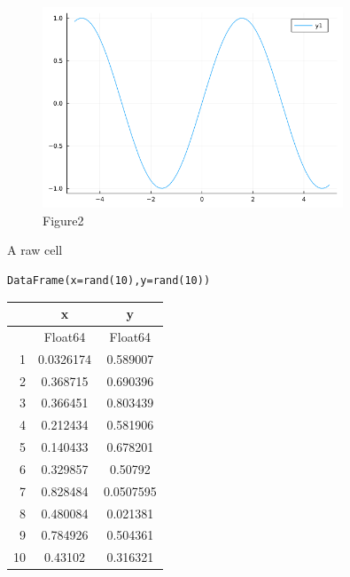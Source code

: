 \begin{figure}[H]
	 \centering
	\includegraphics[width=0.8\textwidth]{./figures/plotexample.png}
	\caption{Figure2}
	\label{fig:plotexample.png}
\end{figure}
A raw cell
\begin{lstlisting}[language=JuliaLocal, style=julia]
DataFrame(x=rand(10),y=rand(10))
\end{lstlisting}

\begin{tabular}{r|cc}
	& x & y\\
	\hline
	& Float64 & Float64\\
	\hline
	1 & 0.0326174 & 0.589007 \\
	2 & 0.368715 & 0.690396 \\
	3 & 0.366451 & 0.803439 \\
	4 & 0.212434 & 0.581906 \\
	5 & 0.140433 & 0.678201 \\
	6 & 0.329857 & 0.50792 \\
	7 & 0.828484 & 0.0507595 \\
	8 & 0.480084 & 0.021381 \\
	9 & 0.784926 & 0.504361 \\
	10 & 0.43102 & 0.316321 \\
\end{tabular}

